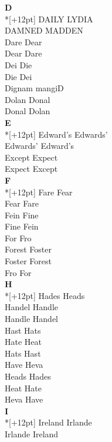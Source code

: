 \vspace{14pt}
\noindent\textbf{\Large D}\\*[+12pt]
DAILY LYDIA\\
DAMNED MADDEN\\
Dare Dear\\
Dear Dare\\
Dei Die\\
Die Dei\\
Dignam mangiD\\
Dolan Donal\\
Donal Dolan\\

\vspace{14pt}
\noindent\textbf{\Large E}\\*[+12pt]
Edward's Edwards'\\
Edwards' Edward's\\
Except Expect\\
Expect Except\\

\vspace{14pt}
\noindent\textbf{\Large F}\\*[+12pt]
Fare Fear\\
Fear Fare\\
Fein Fine\\
Fine Fein\\
For Fro\\
Forest Foster\\
Foster Forest\\
Fro For\\

\vspace{14pt}
\noindent\textbf{\Large H}\\*[+12pt]
Hades Heads\\
Handel Handle\\
Handle Handel\\
Hast Hats\\
Hate Heat\\
Hats Hast\\
Have Heva\\
Heads Hades\\
Heat Hate\\
Heva Have\\

\vspace{14pt}
\noindent\textbf{\Large I}\\*[+12pt]
Ireland Irlande\\
Irlande Ireland\\

